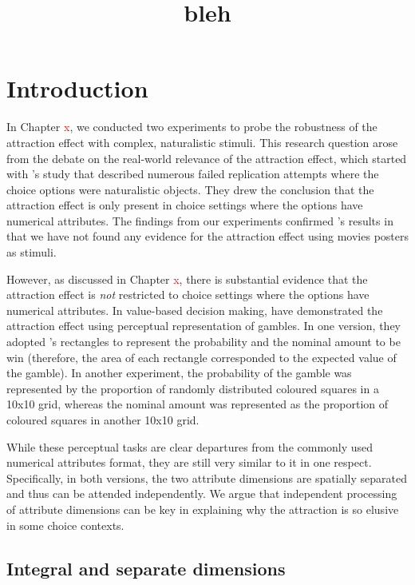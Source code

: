 \documentclass[11pt,a4paper]{article}
\date{}
\title{\huge{bleh}}
\begin{document}
\maketitle


\section{Introduction} 

In Chapter \textcolor{red}{x}, we conducted two experiments to probe the robustness of the attraction effect with complex, naturalistic stimuli. This research question arose from the debate on the real-world relevance of the attraction effect, which started with \citeauthor{Frederick2014a}'s study that described numerous failed replication attempts where the choice options were naturalistic objects. They drew the conclusion that the attraction effect is only present in choice settings where the options have numerical attributes. The findings from our experiments confirmed \citeauthor{Frederick2014a}'s results in that we have not found any evidence for the attraction effect using movies posters as stimuli.

However, as discussed in Chapter \textcolor{red}{x}, there is substantial evidence that the attraction effect is \textit{not} restricted to choice settings where the options have numerical attributes. In value-based decision making,  have demonstrated the attraction effect using perceptual representation of gambles. In one version, they adopted 's rectangles to represent the probability and the nominal amount to be win (therefore, the area of each rectangle corresponded to the expected value of the gamble). In another experiment, the probability of the gamble was represented by the proportion of randomly distributed coloured squares in a 10x10 grid, whereas the nominal amount was represented as the proportion of coloured squares in another 10x10 grid. 

While these perceptual tasks are clear departures from the commonly used numerical attributes format, they are still very similar to it in one respect. Specifically, in both versions, the two attribute dimensions are spatially separated and thus can be attended independently. We argue that independent processing of attribute dimensions can be key in explaining why the attraction is so elusive in some choice contexts.

\subsection{Integral and separate dimensions} 
\end{document}
